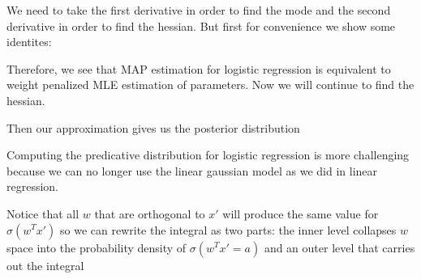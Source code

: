 \documentclass[12pt]{article}
\begin{document}

We need to take the first derivative in order to find the mode and the second derivative in order to find the hessian. But first for convenience we show some identites:


Therefore, we see that MAP estimation for logistic regression is equivalent to weight penalized MLE estimation of parameters. Now we will continue to find the hessian.


Then our approximation gives us the posterior distribution


Computing the predicative distribution for logistic regression is more challenging because we can no longer use the linear gaussian model as we did in linear regression. 


Notice that all $w$ that are orthogonal to $x'$ will produce the same value for $\sigma(w^Tx')$ so we can rewrite the integral as two parts: the inner level collapses $w$ space into the probability density of $\sigma(w^Tx' = a)$ and an outer level that carries out the integral
\end{document}
